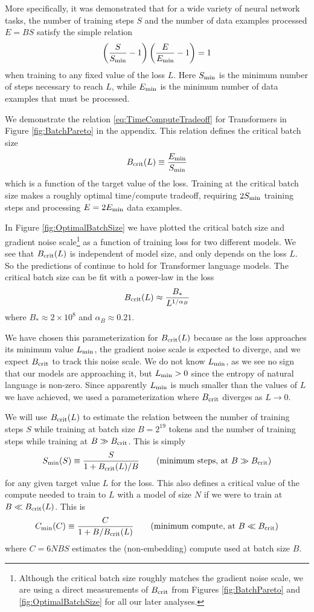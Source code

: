 \documentclass[english]{article}
\newcommand{\be}{\begin{equation}}
\newcommand{\ee}{\end{equation}}
\begin{document}
More specifically, it was demonstrated that for a wide variety of neural network tasks, the number of training steps $S$ and the number of data examples processed $E = B S$ satisfy the simple relation
\be
\label{eq:TimeComputeTradeoff}
\left( \frac{S}{S_{\rm min}} -1 \right) \left( \frac{E}{E_{\rm min}} - 1 \right) = 1
\ee
when training to any fixed value of the loss $L$.  Here $S_{\rm min}$ is the minimum number of steps necessary to reach $L$, while $E_{\rm min}$ is the minimum number of data examples that must be processed. 

We demonstrate the relation \eqref{eq:TimeComputeTradeoff} for Transformers in Figure \ref{fig:BatchPareto} in the appendix. This relation defines the critical batch size 
\be
\label{eq:DefinitionBcrit}
B_{\rm crit}(L) \equiv \frac{E_{\rm min}}{S_{\rm min}}
\ee
which is a function of the target value of the loss.  Training at the critical batch size makes a roughly optimal time/compute tradeoff, requiring $2 S_{\rm min}$ training steps and processing $E = 2 E_{\rm min}$ data examples.  

In Figure \ref{fig:OptimalBatchSize} we have plotted the critical batch size and gradient noise scale\footnote{Although the critical batch size roughly matches the gradient noise scale, we are using a direct measurements of $B_{\rm crit}$ from Figures \ref{fig:BatchPareto} and \ref{fig:OptimalBatchSize} for all our later analyses.  } as a function of training loss for two different models.  We see that $B_{\rm crit}(L)$ is  independent of model size, and only depends on the loss $L$.  So the predictions of \cite{1812.06162} continue to hold for Transformer language models.  The critical batch size can be fit with a power-law in the loss
\be
B_{\rm crit}(L) \approx \frac{B_*}{L^{1/\alpha_B}}
\ee
where $B_* \approx 2 \times 10^8$ and $\alpha_B \approx 0.21$.  

We have chosen this parameterization for $B_{\rm crit}(L)$ because as the loss approaches its minimum value $L_{\rm min}$, the gradient noise scale is expected to diverge, and we expect $B_{\rm crit}$ to track this noise scale.  We do not know $L_{\rm min}$, as we see no sign that our models are approaching it, but $L_{\rm min} > 0$ since the entropy of natural language is non-zero.  Since apparently $L_{\rm min}$ is much smaller than the values of $L$ we have achieved, we used a parameterization where $B_{\rm crit}$ diverges as $L \to 0$. 

We will use $B_{\rm crit}(L)$ to estimate the relation between the number of training steps $S$ while training at batch size $B = 2^{19}$ tokens and the number of training steps while training at $B \gg B_{\rm crit}$.  This is simply
\be
\label{eq:AdjustedSteps}
S_{\rm min}(S) \equiv \frac{S}{1 + B_{\rm crit}(L)/B} \qquad (\text{minimum steps, at } B \gg B_{\rm crit})
\ee
for any given target value $L$ for the loss.  This also defines a critical value of the compute needed to train to $L$ with a model of size $N$ if we were to train at $B \ll B_{\rm crit}(L)$. This is
\be
\label{eq:AdjustedCompute}
C_{\rm min}(C) \equiv \frac{C  }{1 + B/B_{\rm crit}(L) } \qquad (\text{minimum compute, at } B \ll B_{\rm crit})
\ee
where $C = 6 N BS$ estimates the (non-embedding) compute used at batch size $B$.
\end{document}
